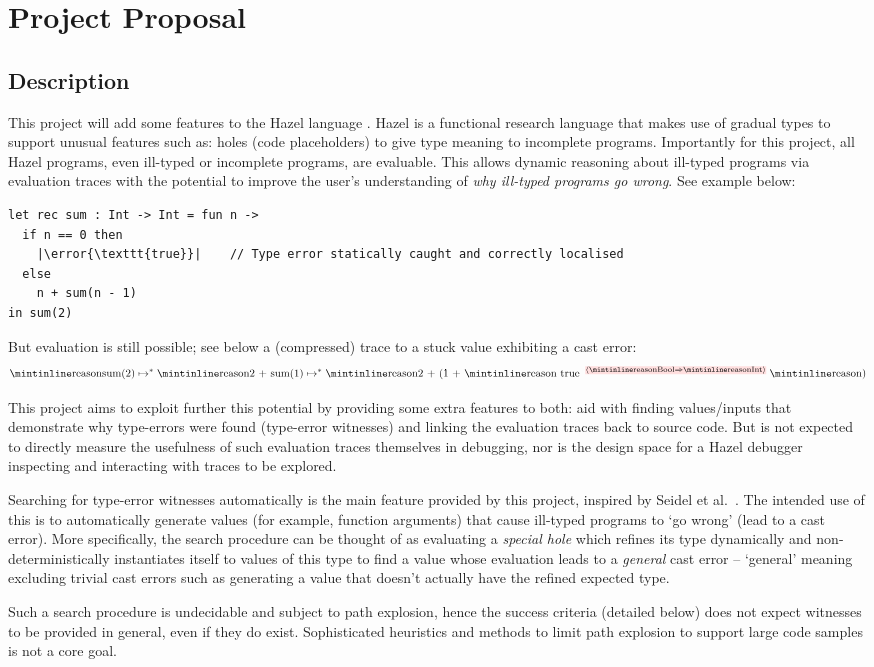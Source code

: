 \chapter{Project Proposal}
\label{sec:ProjectProposal}
\section{Description}
This project will add some features to the Hazel language \cite{Hazel}. Hazel is a functional research language that makes use of gradual types to support unusual features such as: holes (code placeholders) to give type meaning to incomplete programs. Importantly for this project, all Hazel programs, even ill-typed or incomplete programs, are evaluable. This allows dynamic reasoning about ill-typed programs via evaluation traces with the potential to improve the user's understanding of \textit{why ill-typed programs go wrong}. See example below:\par
\begin{verbatim}
let rec sum : Int -> Int = fun n ->
  if n == 0 then
    |\error{\texttt{true}}|    // Type error statically caught and correctly localised
  else
    n + sum(n - 1)
in sum(2)
\end{verbatim}
But evaluation is still possible; see below a (compressed) trace to a stuck value exhibiting a cast error:
\[\code{sum(2)} \mapsto^{*} \code{2 + sum(1)} \mapsto^{*} \code{2 + (1 + } \casterror{Bool}{Int}{ true}\code{)}\]
 
This project aims to exploit further this potential by providing some extra features to both: aid with finding values/inputs that demonstrate why type-errors were found (type-error witnesses) and linking the evaluation traces back to source code. But is not expected to directly measure the usefulness of such evaluation traces themselves in debugging, nor is the design space for a Hazel debugger inspecting and interacting with traces to be explored.\par 
Searching for type-error witnesses automatically is the main feature provided by this project, inspired by Seidel et al.\  \cite{SearchProc}. The intended use of this is to automatically generate values (for example, function arguments) that cause ill-typed programs to `go wrong' (lead to a cast error). More specifically, the search procedure can be thought of as evaluating a \textit{special hole} which refines its type dynamically and non-deterministically instantiates itself to values of this type to find a value whose evaluation leads to a \textit{general} cast error -- `general' meaning excluding trivial cast errors such as generating a value that doesn't actually have the refined expected type.  \par 
Such a search procedure is undecidable and subject to path explosion, hence the success criteria (detailed below) does not expect witnesses to be provided in general, even if they do exist. Sophisticated heuristics and methods to limit path explosion to support large code samples is not a core goal.\par 

